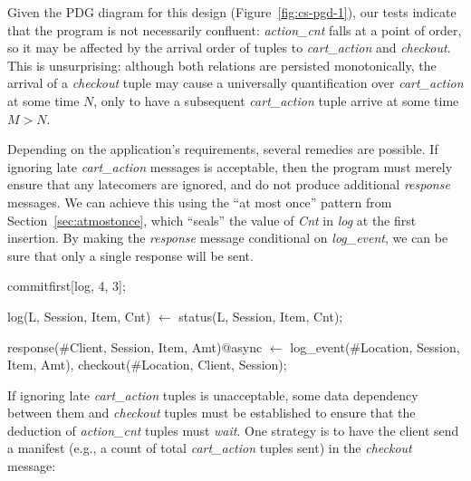 Given the PDG diagram for this design (Figure~\ref{fig:cs-pgd-1}),
our tests indicate that the program is not necessarily confluent: 
{\em action\_cnt} falls at a point of order, so it may
be affected by the arrival order of tuples to {\em cart\_action} and
{\em checkout}.  This is unsurprising: although both relations are persisted monotonically,
the arrival of a {\em checkout} tuple may cause a universally quantification over {\em cart\_action}
at some time $N$, only to have a subsequent {\em cart\_action} tuple arrive at some time $M > N$.

Depending on the application's requirements, several remedies are possible. If ignoring
late {\em cart\_action} messages is acceptable, then the program must merely ensure
that any latecomers are ignored, and 
do not produce additional {\em response} messages.
We can achieve this using the ``at most once'' pattern from Section~\ref{sec:atmostonce}, which ``seals'' the value
of {\em Cnt} in {\em log} at the first insertion. By making the {\em response} message conditional on \emph{log\_event}, we can be sure that only a single response will be sent.

\begin{Dedalus}
commitfirst[log, 4, 3];

log(L, Session, Item, Cnt) \(\leftarrow\) 
    status(L, Session, Item, Cnt);

response(#Client, Session, Item, Amt)@async \(\leftarrow\)
    log_event(#Location, Session, Item, Amt),
    checkout(#Location, Client, Session);
\end{Dedalus}

If ignoring late {\em cart\_action} tuples is unacceptable,
some data dependency between them and {\em checkout} tuples must be established
to ensure that the deduction of {\em action\_cnt} tuples must {\em wait}.  
One strategy 
is to have the client send a manifest (e.g., a count of total {\em cart\_action} tuples
sent) in the {\em checkout} message:

